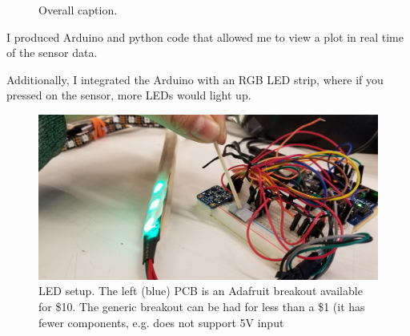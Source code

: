\documentclass[preprint,12pt,3p]{elsarticle}
\begin{document}
\begin{figure}[htbp]
    \centering 
        \hfil %
        \hfil
        \hfil 
    \caption{ Overall caption.}
\end{figure}

I produced Arduino and python code that allowed me to view a plot in real time of the sensor data.

Additionally, I integrated the Arduino with an RGB LED strip, where if you pressed on the sensor,
more LEDs would light up.

\begin{figure}[H]
\centering
\includegraphics[width=.8\textwidth]{images/sensor/poke.jpg}
\caption{LED setup. The left (blue) PCB is an Adafruit breakout available for
\$10. The generic breakout can be had for less than a \$1 (it has fewer
components, e.g. does not support 5V input}
\end{figure}
\end{document}
